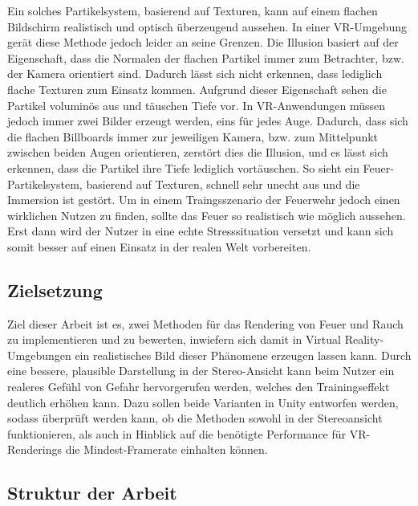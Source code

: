 Ein solches Partikelsystem, basierend auf Texturen, kann auf einem flachen Bildschirm realistisch
und optisch überzeugend aussehen. In einer VR-Umgebung gerät diese Methode jedoch leider an seine Grenzen.
Die Illusion basiert auf der Eigenschaft, dass die Normalen der flachen Partikel immer zum Betrachter, bzw. der Kamera
orientiert sind. Dadurch lässt sich nicht erkennen, dass lediglich flache Texturen zum Einsatz kommen.
Aufgrund dieser Eigenschaft sehen die Partikel voluminös aus und täuschen Tiefe vor.
In VR-Anwendungen müssen jedoch immer zwei Bilder erzeugt werden, eins für jedes Auge.
Dadurch, dass sich die flachen Billboards immer zur jeweiligen Kamera, bzw. zum Mittelpunkt
zwischen beiden Augen orientieren, zerstört dies die Illusion, und es lässt sich erkennen, dass
die Partikel ihre Tiefe lediglich vortäuschen. So sieht ein Feuer-Partikelsystem, basierend auf Texturen,
schnell sehr unecht aus und die Immersion ist gestört.
Um in einem Traingsszenario der Feuerwehr jedoch einen wirklichen Nutzen zu finden, sollte das Feuer
so realistisch wie möglich aussehen. Erst dann wird der Nutzer in eine echte Stresssituation versetzt
und kann sich somit besser auf einen Einsatz in der realen Welt vorbereiten.

\subsection{Zielsetzung}

Ziel dieser Arbeit ist es, zwei Methoden für das Rendering von Feuer und Rauch zu implementieren und zu bewerten, 
inwiefern sich damit in Virtual Reality-Umgebungen ein realistisches Bild dieser Phänomene erzeugen lassen kann. 
Durch eine bessere, plausible Darstellung in der Stereo-Ansicht kann beim Nutzer ein realeres Gefühl von Gefahr hervorgerufen 
werden, welches den Trainingseffekt deutlich erhöhen kann. 
Dazu sollen beide Varianten in Unity entworfen werden, sodass überprüft werden kann, ob die Methoden
sowohl in der Stereoansicht funktionieren, als auch in Hinblick auf die benötigte Performance für VR-Renderings 
die Mindest-Framerate einhalten können. 


\subsection{Struktur der Arbeit}

